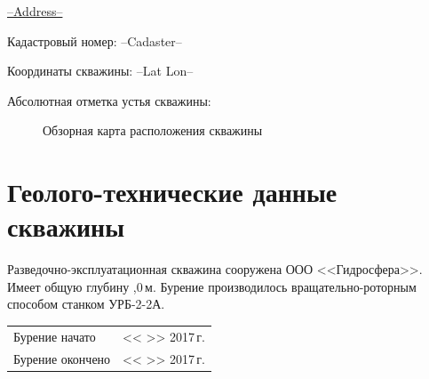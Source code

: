 \documentclass[a4paper,12pt]{article} %
\newcommand{\txtExecutor}{ООО <<Гидросфера>>}	%
\newcommand{\txtYear}{2017}						%
\newcommand{\txtAddress}{--Address--}
\newcommand{\txtHeight}{ }						%
\newcommand{\txtCadaster}{--Cadaster--} 		%
\newcommand{\txtCoords}{--Lat Lon--}	%
\newcommand{\txtDepth}{,0}					%
\begin{document}
	\underline{\txtAddress}

	\bigskip

	Кадастровый номер: \txtCadaster

	Координаты скважины: \txtCoords
	
	Абсолютная отметка устья скважины: \txtHeight

	\begin{figure}[h]
		\caption{Обзорная карта расположения скважины}
	\end{figure}

    \section*{Геолого-технические данные скважины}

    Разведочно-эксплуатационная скважина сооружена \txtExecutor. Имеет общую глубину \txtDepth \,м.   Бурение производилось вращательно-роторным способом станком УРБ-2-2А.

    \bigskip


	\begin{tabular}{@{}ll}
	Бурение начато & << \underline{\hspace{0.7cm}} >> \underline{\hspace{3cm}} \txtYear \,г.\\
	Бурение окончено & << \underline{\hspace{0.7cm}} >> \underline{\hspace{3cm}} \txtYear \,г.\\
	\end{tabular}
	
\end{document}
